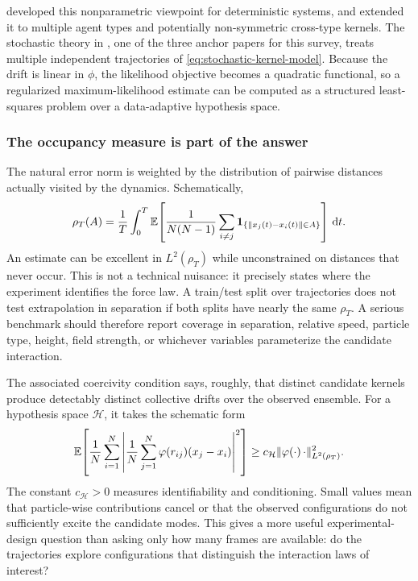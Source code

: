 \citet{lu2019interactionlaws} developed this nonparametric viewpoint for deterministic systems, and \citet{lu2021heterogeneous} extended it to multiple agent types and potentially non-symmetric cross-type kernels. The stochastic theory in \citet{lu2022stochasticinteractions}, one of the three anchor papers for this survey, treats multiple independent trajectories of \cref{eq:stochastic-kernel-model}. Because the drift is linear in \(\phi\), the likelihood objective becomes a quadratic functional, so a regularized maximum-likelihood estimate can be computed as a structured least-squares problem over a data-adaptive hypothesis space.

\subsubsection{The occupancy measure is part of the answer}

The natural error norm is weighted by the distribution of pairwise distances actually visited by the dynamics. Schematically,
\begin{equation}
\rho_T(A)
=
\frac{1}{T}\int_0^T
\mathbb{E}\!\left[
\frac{1}{N(N-1)}
\sum_{i\ne j}
\mathbf 1_{\{\lVert x_j(t)-x_i(t)\rVert\in A\}}
\right]\,\mathrm{d} t .
\label{eq:occupancy-measure}
\end{equation}
An estimate can be excellent in \(L^2(\rho_T)\) while unconstrained on distances that never occur. This is not a technical nuisance: it precisely states where the experiment identifies the force law. A train/test split over trajectories does not test extrapolation in separation if both splits have nearly the same \(\rho_T\). A serious benchmark should therefore report coverage in separation, relative speed, particle type, height, field strength, or whichever variables parameterize the candidate interaction.

The associated coercivity condition says, roughly, that distinct candidate kernels produce detectably distinct collective drifts over the observed ensemble. For a hypothesis space \(\mathcal H\), it takes the schematic form
\begin{equation}
\mathbb{E}\!\left[
\frac{1}{N}\sum_{i=1}^{N}
\left|
\frac{1}{N}\sum_{j=1}^{N}
\varphi(r_{ij})(x_j-x_i)
\right|^2
\right]
\ge
c_{\mathcal H}
\lVert \varphi(\cdot)\,\cdot\rVert_{L^2(\rho_T)}^2 .
\label{eq:coercivity-many-body}
\end{equation}
The constant \(c_{\mathcal H}>0\) measures identifiability and conditioning. Small values mean that particle-wise contributions cancel or that the observed configurations do not sufficiently excite the candidate modes. This gives a more useful experimental-design question than asking only how many frames are available: do the trajectories explore configurations that distinguish the interaction laws of interest?

